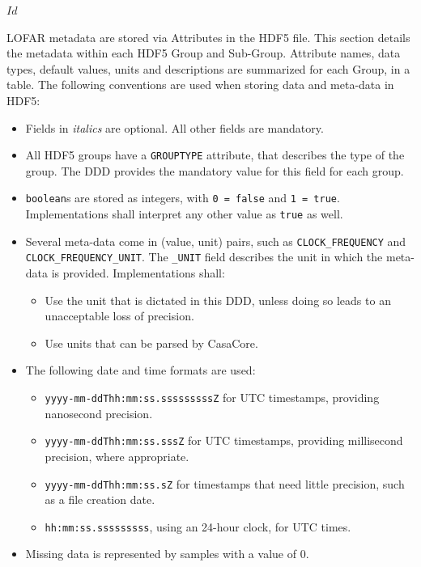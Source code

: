 \svnInfo $Id$

LOFAR metadata are stored via Attributes in the HDF5 file.  This section
details the metadata within each HDF5 Group and Sub-Group.  Attribute names,
data types, default values, units and descriptions are summarized for each
Group, in a table. The following conventions are used when storing data and
meta-data in HDF5:

\begin{itemize}
\item Fields in {\it italics} are optional. All other fields are mandatory.

\item All HDF5 groups have a \verb|GROUPTYPE| attribute, that describes the type of the group. The DDD provides the mandatory value for this field for each group.

\item \verb|boolean|s are stored as integers, with \verb|0 = false| and \verb|1 = true|. Implementations shall interpret any other value as \verb|true| as well.

\item Several meta-data come in (value, unit) pairs, such as \verb|CLOCK_FREQUENCY| and \verb|CLOCK_FREQUENCY_UNIT|. The \verb|_UNIT| field describes the unit in which the meta-data is provided. Implementations shall:
\begin{itemize}
\item Use the unit that is dictated in this DDD, unless doing so leads to an unacceptable loss of precision.
\item Use units that can be parsed by CasaCore.
\end{itemize}

\item The following date and time formats are used:
\begin{itemize}
\item \verb|yyyy-mm-ddThh:mm:ss.sssssssssZ| for UTC timestamps, providing nanosecond precision.
\item \verb|yyyy-mm-ddThh:mm:ss.sssZ| for UTC timestamps, providing millisecond precision, where appropriate. 
\item \verb|yyyy-mm-ddThh:mm:ss.sZ| for timestamps that need little precision, such as a file creation date.
\item \verb|hh:mm:ss.sssssssss|, using an 24-hour clock, for UTC times.
\end{itemize}

\item Missing data is represented by samples with a value of $0$.

\end{itemize}


